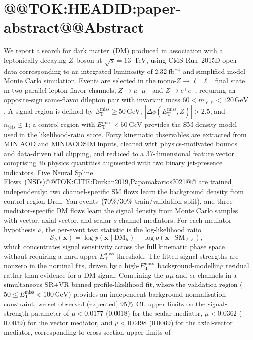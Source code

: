 \documentclass[11pt]{article}
\makeatletter
\newcommand{\GeV}{\text{GeV}}
\newcommand{\MET}{\ensuremath{E_{\mathrm{T}}^{\mathrm{miss}}}}
\newenvironment{abstract}{\section*{@@TOK:HEADID:paper-abstract@@Abstract}}{}
\makeatother
\begin{document}
\begin{abstract}
  We report a search for dark matter~(DM) produced in association with a
  leptonically decaying $Z$~boson at $\sqrt{s}=13$~TeV, using CMS Run~2015D
  open data corresponding to an integrated luminosity of $2.32~\mathrm{fb}^{-1}$
  and simplified-model Monte Carlo simulation.
  Events are selected in the mono-$Z\to\ell^+\ell^-$ final state in two
  parallel lepton-flavor channels, $Z\to\mu^+\mu^-$ and $Z\to e^+e^-$,
  requiring an opposite-sign same-flavor dilepton pair with invariant mass
  $60 < m_{\ell\ell} < 120\,\GeV$.
  A signal region is defined by $\MET \ge 50\,\GeV$,
  $|\Delta\phi(\MET, Z)| > 2.5$, and $n_{\mathrm{jets}} \le 1$;
  a control region with $\MET < 50\,\GeV$ provides the SM density model used in
  the likelihood-ratio score.
  Forty kinematic observables are extracted from MINIAOD and MINIAODSIM inputs,
  cleaned with physics-motivated bounds and data-driven tail clipping, and
  reduced to a 37-dimensional feature vector comprising 35 physics quantities
  augmented with two binary jet-presence indicators.
  Five Neural Spline Flows~(NSFs)@@TOK:CITE:Durkan2019,Papamakarios2021@@ are trained
  independently: two channel-specific SM flows learn the background density from
  control-region Drell--Yan events~(70\%/30\% train/validation split), and three
  mediator-specific DM flows learn the signal density from Monte Carlo samples
  with vector, axial-vector, and scalar $s$-channel mediators.
  For each mediator hypothesis $h$, the per-event test statistic is the
  log-likelihood ratio
  \begin{equation*}
    \mathcal{S}_h(\mathbf{x})
    = \log p(\mathbf{x}\mid\mathrm{DM}_h)
    - \log p(\mathbf{x}\mid\mathrm{SM}_{\ell\ell}),
  \end{equation*}
  which concentrates signal sensitivity across the full kinematic phase space
  without requiring a hard upper $\MET$ threshold.
  The fitted signal strengths are nonzero in the nominal fits, driven by a
  high-\MET\ background-modelling residual rather than evidence for a DM signal.
  Combining the $\mu\mu$ and $ee$ channels in a simultaneous SR+VR
  binned profile-likelihood fit, where the validation region
  ($50\le\MET<100\,\GeV$) provides an independent background
  normalisation constraint, we set observed (expected) 95\%~CL upper
  limits on the signal-strength parameter of
  $\mu<0.0177$ ($0.0018$) for the scalar mediator,
  $\mu<0.0362$ ($0.0039$) for the vector mediator, and
  $\mu<0.0498$ ($0.0069$) for the axial-vector mediator,
  corresponding to cross-section upper limits of

\end{abstract}
\end{document}
